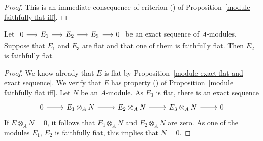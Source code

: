 \begin{proof}
This is an immediate consequence of criterion () of Proposition~\ref{module faithfully flat iff}.
\end{proof}
\begin{proposition}\label{module faithfully flat and exact sequence}
Let $\begin{tikzcd}[column sep=15pt]0\ar[r]&E_1\ar[r]&E_2\ar[r]&E_3\ar[r]&0\end{tikzcd}$ be an exact sequence of $A$-modules. Suppose that $E_1$ and $E_3$ are flat and that one of them is faithfully flat. Then $E_2$ is faithfully flat.
\end{proposition}
\begin{proof}
We know already that $E$ is flat by Proposition~\ref{module exact flat and exact sequence}. We verify that $E$ has property () of Proposition~\ref{module faithfully flat iff}. Let $N$ be an $A$-module. As $E_3$ is flat, there is an exact sequence
\[\begin{tikzcd}
0\ar[r]&E_1\otimes_AN\ar[r]&E_2\otimes_AN\ar[r]&E_3\otimes_AN\ar[r]&0
\end{tikzcd}\]
If $E\otimes_AN=0$, it follows that $E_1\otimes_AN$ and $E_2\otimes_AN$ are zero. As one of the modules $E_1$, $E_2$ is faithfully fiat, this implies that $N=0$.
\end{proof}

